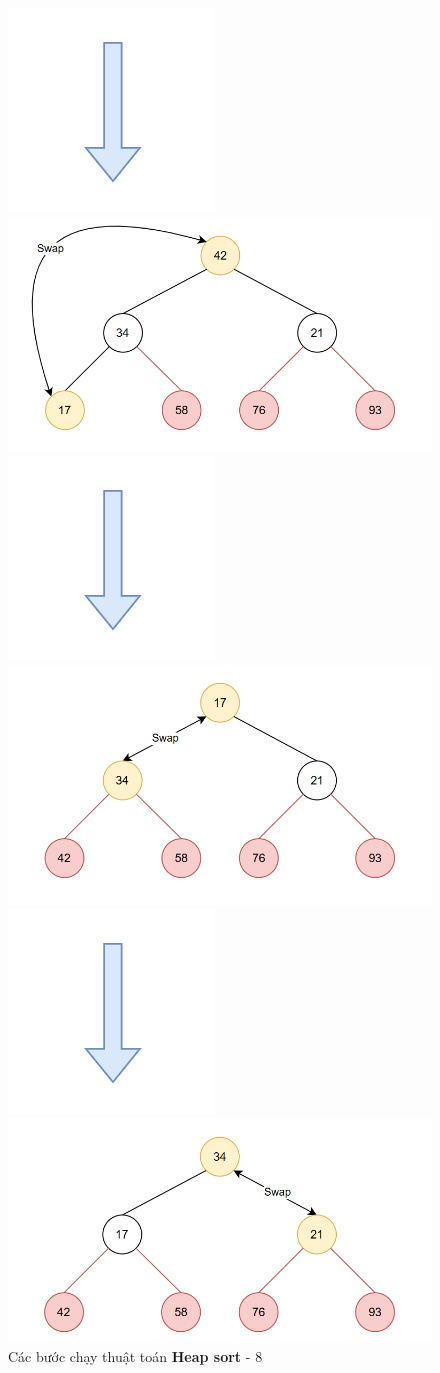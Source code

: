 \begin{figure}[H]
    \centering
    \includegraphics[width=0.1\linewidth]{img/heap_sort/arrow.png}
    \vspace{0.01cm}

    \includegraphics[width=0.5\linewidth]{img/heap_sort/19.png}
    \vspace{0.01cm}

    \includegraphics[width=0.1\linewidth]{img/heap_sort/arrow.png}
    \vspace{0.01cm}

    \includegraphics[width=0.5\linewidth]{img/heap_sort/20.png}
    \vspace{0.01cm}

    \includegraphics[width=0.1\linewidth]{img/heap_sort/arrow.png}
    \vspace{0.01cm}

    \includegraphics[width=0.5\linewidth]{img/heap_sort/21.png}

    \caption{Các bước chạy thuật toán \textbf{Heap sort} - 8}
\end{figure}

